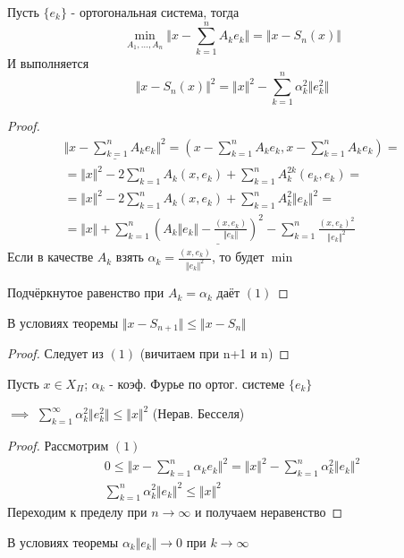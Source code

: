 \documentclass{article}
\begin{document}
\begin{theorem}
  Пусть $\{e_k\}$ - ортогональная система, тогда
  \[
    \min_{A_1,\dots ,A_n}\Vert x- \sum_{k=1}^{n}A_ke_k \Vert=\Vert x- S_n(x) \Vert
  \]
  И выполняется
  \[
    \Vert x-S_n(x) \Vert^{2}=\Vert x \Vert^{2}-\sum_{k=1}^{n}\alpha_k^{2}\Vert e_k^{2} \Vert \tag{1}
  \]
\end{theorem}
\begin{proof}
  \begin{gather*}
    \underline{\Vert x-\sum_{k=1}^{n}A_ke_k \Vert^{2}}=(x-\sum_{k=1}^{n}A_ke_k,x-\sum_{k=1}^{n}A_ke_k) = \\ 
    = \Vert x \Vert^{2}-2\sum_{k=1}^{n}A_k(x,e_k) + \sum_{k=1}^{n}A_k^{2k}(e_k,e_k)= \\ 
    = \Vert x \Vert^{2}-2\sum_{k=1}^{n}A_k(x,e_k)+\sum_{k=1}^{n}A_k^{2}\Vert e_k \Vert^{2}= \\ 
    = \underline{\Vert x \Vert + \sum_{k=1}^{n}(A_k\Vert e_k \Vert-\frac{(x,e_k)}{\Vert e_k \Vert})^{2} - \sum_{k=1}^{n}\frac{(x,e_k)^{2}}{\Vert e_k \Vert^{2}}}
  \end{gather*}
  Если в качестве $A_k$ взять $\alpha_k=\frac{(x,e_k)}{\Vert e_k \Vert^{2}}$, то будет $\min$

  Подчёркнутое равенство при $A_k=\alpha_k$ даёт $(1)$
\end{proof}
\begin{corollary}
  В условиях теоремы $\Vert x-S_{n+1} \Vert \le \Vert x-S_n \Vert$
\end{corollary}
\begin{proof}
  Следует из $(1)$ (вичитаем при n+1 и n)
\end{proof}
\begin{theorem}[Т3]
  Пусть $x\in X_\Pi$; $\alpha_k$ - коэф. Фурье по ортог. системе $\{e_k\}$
  
  $\implies$ $\sum_{k=1}^{\infty}\alpha_k^{2}\Vert e_k^{2} \Vert \le \Vert x \Vert^{2}$ (Нерав. Бесселя)
\end{theorem}
\begin{proof}
  Рассмотрим $(1)$
  \begin{gather*}
    0 \le \Vert x-\sum_{k=1}^{n}\alpha_ke_k \Vert^{2}=\Vert x \Vert^{2}-\sum_{k=1}^{n}\alpha_k^{2}\Vert e_k \Vert^{2} \\ 
    \sum_{k=1}^{n}\alpha_k^{2}\Vert e_k \Vert^{2} \le \Vert x \Vert^{2}
  \end{gather*}
  Переходим к пределу при $n\to\infty$ и получаем неравенство
\end{proof}
\begin{corollary}
  В условиях теоремы $\alpha_k\Vert e_k \Vert{\to}0$ при $k\to\infty$
\end{corollary}
\end{document}
